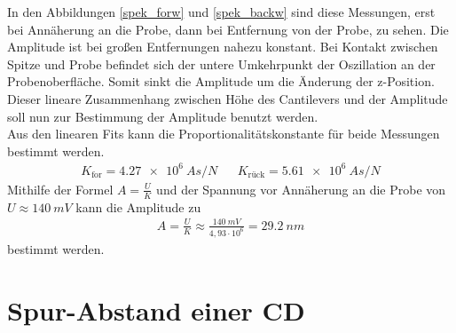 In den Abbildungen \ref{spek_forw} und \ref{spek_backw} sind diese Messungen, erst
bei Annäherung an die Probe, dann bei Entfernung von der Probe, zu sehen. Die 
Amplitude ist bei großen Entfernungen nahezu konstant. Bei Kontakt zwischen Spitze
und Probe befindet sich der untere Umkehrpunkt der Oszillation an der 
Probenoberfläche.
Somit sinkt die Amplitude um die Änderung der z-Position. Dieser lineare 
Zusammenhang zwischen Höhe des Cantilevers und der Amplitude soll nun zur 
Bestimmung der Amplitude benutzt werden.
\vspace{6pt}\\
Aus den linearen Fits kann die Proportionalitätskonstante für beide Messungen
bestimmt werden.
\begin{align*}
    K_{\text{for}} = \SI{4,27e6}{A s \per N} & & K_{\text{rück}} = 
    \SI{5,61e6}{A s \per N}
\end{align*}
Mithilfe der Formel $\displaystyle A = \frac{U}{K}$ und der Spannung vor Annäherung
an die Probe von $U \approx \SI{140}{mV}$ kann die Amplitude zu
\begin{align*}
    A = \frac{U}{K} \approx \frac{\SI{140}{mV}}{4,93 \cdot 10^6} = \SI{29,2}{nm}
\end{align*}
bestimmt werden.

    \section{Spur-Abstand einer CD}

